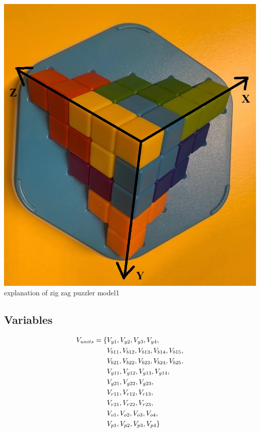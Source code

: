 \begin{center}
\includegraphics[scale=0.5]{ZIGZAGmodel1board.jpg} \\
explanation of zig zag puzzler model1
\end{center}
\subsection{Variables}
\begin{align*}
V_{units}=\{&V_{y1},V_{y2},V_{y3},V_{y4},\\&V_{b11},V_{b12},V_{b13},V_{b14},
V_{b15},\\&V_{b21},V_{b22},V_{b23},V_{b24},V_{b25},\\&V_{g11},V_{g12},V_{g13},V_{g14},\\&V_{g21},V_{g22},V_{g23},\\&V_{r11},
V_{r12},V_{r13},\\&V_{r21},V_{r22},V_{r23},\\&V_{o1},V_{o2},V_{o3},V_{o4},\\&V_{p1},V_{p2},V_{p3},V_{p4}\}
\end{align*}
